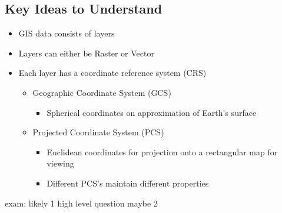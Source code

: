 \documentclass[11pt]{article}
\theoremstyle{definition}
\begin{document}
\subsection{Key Ideas to Understand}
\begin{itemize}
    \item GIS data consists of layers
    \item Layers can either be Raster or Vector
    \item Each layer has a coordinate reference system
    (CRS)
    \begin{itemize}
        \item Geographic Coordinate System (GCS)
        \begin{itemize}
            \item Spherical coordinates on approximation of Earth’s surface
        \end{itemize}
        \item Projected Coordinate System (PCS)
        \begin{itemize}
            \item Euclidean coordinates for projection onto a rectangular map
            for viewing
            \item Different PCS’s maintain different properties
        \end{itemize} 
    \end{itemize}
\end{itemize}

exam: likely 1 high level question maybe 2
\end{document}
